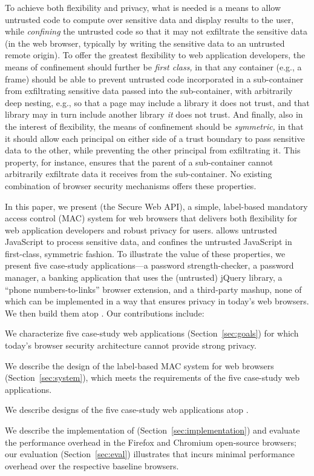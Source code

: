 To achieve both flexibility and privacy, what is needed is a means to
allow untrusted code to compute over sensitive data and display
results to  the user, while {\em confining} the untrusted code so that
it may not exfiltrate the sensitive data (in the web browser,
typically by writing the sensitive data to an untrusted remote
origin). To offer the greatest flexibility to web application
developers, the means of confinement should further be {\em first
  class,} in that any container (e.g., a frame) should be able
to prevent untrusted code incorporated in a sub-container from
exfiltrating sensitive data passed into the sub-container, with
arbitrarily deep nesting, e.g., so that a page may include a
library it does not trust, and that library may in turn include
another library {\em it} does not trust. And finally, also in the
interest of flexibility, the means of confinement should be {\em
  symmetric,} in that it should allow each principal on either side of
a trust boundary to pass sensitive data to the other, while preventing
the other principal from exfiltrating it.  
%
This property, for instance, ensures that the parent of a
sub-container cannot arbitrarily exfiltrate data it receives from the
sub-container.
%
No existing combination of browser security mechanisms offers these
properties.

In this paper, we present \sys{} (the Secure Web API), a simple,
label-based mandatory access control (MAC) system for web browsers
that delivers both flexibility for web application developers and
robust privacy for users. \sys{} allows untrusted JavaScript to
process sensitive data, and confines the untrusted JavaScript in
first-class, symmetric fashion.  To illustrate the value of these
properties, we present five case-study applications---a password
strength-checker, a password manager, a banking application that uses
the (untrusted) jQuery library, a ``phone numbers-to-links'' browser
extension, and a third-party mashup, none of which can be implemented
in a way that ensures privacy in today's web browsers.  We then build
them atop \sys. Our contributions include:

\begin{CompactItemize}
\item We characterize five case-study web applications
  (Section~\ref{sec:goals}) for which today's browser security
  architecture cannot provide strong privacy.
\item We describe the design of the \sys{} label-based MAC system
  for web browsers (Section~\ref{sec:system}), which meets the
  requirements of the five case-study web applications.
\item We describe designs of the five case-study web applications atop
  \sys.
\item We describe the implementation of \sys{}
  (Section~\ref{sec:implementation}) and evaluate the performance
  overhead in the Firefox and Chromium open-source browsers; our
  evaluation (Section~\ref{sec:eval}) illustrates that \sys{} incurs
  minimal performance overhead over the respective baseline browsers.
\end{CompactItemize}

